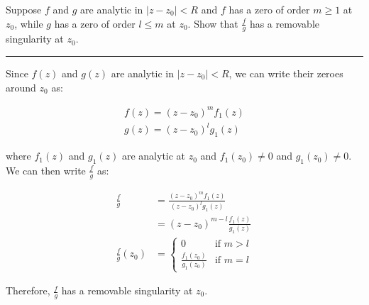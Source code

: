 \begin{example}

    Suppose \( f \) and \( g \) are analytic in \( |z - z_0| < R \) and \( f \) has a zero of order \( m \geq 1 \) at \( z_0 \), while \( g \) has a zero of order \( l \leq m \) at \( z_0 \). Show that \( \frac{f}{g} \) has a removable singularity at \( z_0 \).

    \hrule
    \vspace{0.5cm}

    Since $f(z)$ and $g(z)$ are analytic in $|z - z_0| < R$, we can write their zeroes around $z_0$ as:

    \begin{align*}
        f(z) = (z - z_0)^m f_1(z) \\
        g(z) = (z - z_0)^l g_1(z)
    \end{align*}

    where $f_1(z)$ and $g_1(z)$ are analytic at $z_0$ and $f_1(z_0) \neq 0$ and $g_1(z_0) \neq 0$. We can then write $\frac{f}{g}$ as:

    \begin{align*}
        \frac{f}{g}      & = \frac{(z - z_0)^m f_1(z)}{(z - z_0)^l g_1(z)} \\
                         & = (z - z_0)^{m-l} \frac{f_1(z)}{g_1(z)}         \\
        \frac{f}{g}(z_0) & = \begin{cases}
                                 0                         & \text{if } m > l \\
                                 \frac{f_1(z_0)}{g_1(z_0)} & \text{if } m = l
                             \end{cases}
    \end{align*}

    Therefore, $\frac{f}{g}$ has a removable singularity at $z_0$.
\end{example}